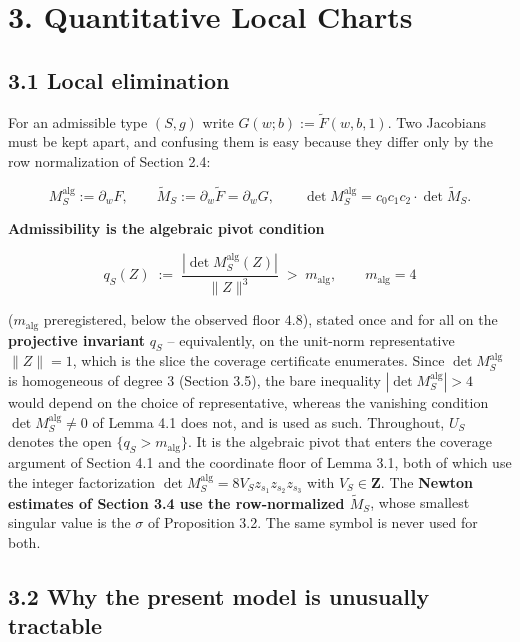 \section{3. Quantitative Local Charts}\label{quantitative-local-charts}

\subsection{3.1 Local elimination}\label{local-elimination}

For an admissible type \((S, g)\) write \(G(w; b) := \tilde F(w, b, 1)\). Two Jacobians must be kept apart, and confusing them is easy because they differ only by the row normalization of Section 2.4:

\[M_S^{\mathrm{alg}} := \partial_w F, \qquad
\tilde M_S := \partial_w \tilde F = \partial_w G,
\qquad
\det M_S^{\mathrm{alg}} = c_0 c_1 c_2 \cdot \det \tilde M_S .\]

\textbf{Admissibility is the algebraic pivot condition}

\[q_S(Z) \;:=\; \frac{|\det M_S^{\mathrm{alg}}(Z)|}{\lVert Z \rVert^3}
\;>\; m_{\mathrm{alg}}, \qquad m_{\mathrm{alg}} = 4\]

(\(m_{\mathrm{alg}}\) preregistered, below the observed floor \(4.8\)), stated once and for all on the \textbf{projective invariant} \(q_S\) -- equivalently, on the unit-norm representative \(\lVert Z \rVert = 1\), which is the slice the coverage certificate enumerates. Since \(\det M_S^{\mathrm{alg}}\) is homogeneous of degree \(3\) (Section 3.5), the bare inequality \(|\det M_S^{\mathrm{alg}}| > 4\) would depend on the choice of representative, whereas the vanishing condition \(\det M_S^{\mathrm{alg}} \neq 0\) of Lemma 4.1 does not, and is used as such. Throughout, \(U_S\) denotes the open \(\{q_S > m_{\mathrm{alg}}\}\). It is the algebraic pivot that enters the coverage argument of Section 4.1 and the coordinate floor of Lemma 3.1, both of which use the integer factorization \(\det M_S^{\mathrm{alg}} = 8 V_S z_{s_1} z_{s_2} z_{s_3}\) with \(V_S \in \mathbf{Z}\). The \textbf{Newton estimates of Section 3.4 use the row-normalized \(\tilde M_S\)}, whose smallest singular value is the \(\sigma\) of Proposition 3.2. The same symbol is never used for both.

\subsection{3.2 Why the present model is unusually tractable}\label{why-the-present-model-is-unusually-tractable}

